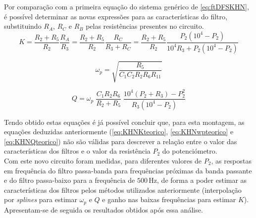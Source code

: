 \documentclass[a4paper,11pt]{report}
\begin{document}
Por comparação com a primeira equação do sistema genérico de \ref{eq:ftDFSKHN}, é possível determinar as novas expressões para as características do filtro, substituindo $R_A$, $R_C$ e $R_B$ pelas resistências presentes no circuito.
\begin{equation}
K=\dfrac{R_2+R_5}{R_2}\dfrac{R_A}{R_3}=\dfrac{R_2+R_5}{R_2}\dfrac{R_C}{R_3+R_C}=\dfrac{R_2+R_5}{R_2}\dfrac{P_2(10^4-P_2)}{10^4R_3+P_2(10^4-P_2)}
\end{equation}

\begin{equation}
\omega_p=\sqrt{\dfrac{R_5}{C_1C_2R_2R_6R_{11}}}
\end{equation}

\begin{equation}
Q=\omega_p\;\dfrac{C_1R_2R_6}{R_2+R_5}\;\dfrac{10^4(P_2+R_3)-P_2^2}{R_3(10^4-P_2)}
\end{equation}

Tendo obtido estas equações é já possível concluir que, para esta montagem, as equações deduzidas anteriormente (\ref{eq:KHNKteorico}, \ref{eq:KHNwpteorico} e \ref{eq:KHNQteorico}) não são válidas para descrever a relação entre o valor das características dos filtros e o valor da resistência $P_2$ do potenciómetro.\\

Com este novo circuito foram medidas, para diferentes valores de $P_2$, as respostas em frequência do filtro passa-banda para frequências próximas da banda passante e do filtro passa-baixo para a frequência de $500\, \textrm{Hz}$, de forma a poder estimar as características dos filtros pelos métodos utilizados anteriormente (interpolação por \textit{splines} para estimar $\omega_p$ e $Q$ e ganho nas baixas frequências para estimar $K$). Apresentam-se de seguida os resultados obtidos após essa análise.
\end{document}
